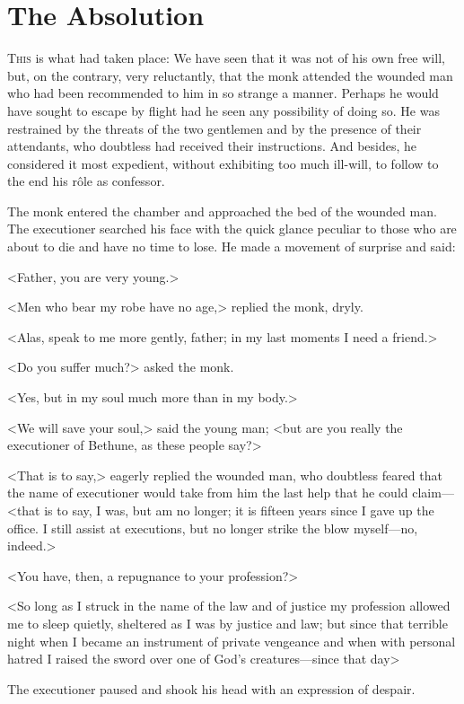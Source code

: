 \chapter{The Absolution}

 \lettrine{T}{his} is what had taken place: We have seen that it was not of his own free will, but, on the contrary, very reluctantly, that the monk attended the wounded man who had been recommended to him in so strange a manner. Perhaps he would have sought to escape by flight had he seen any possibility of doing so. He was restrained by the threats of the two gentlemen and by the presence of their attendants, who doubtless had received their instructions. And besides, he considered it most expedient, without exhibiting too much ill-will, to follow to the end his rôle as confessor.

The monk entered the chamber and approached the bed of the wounded man. The executioner searched his face with the quick glance peculiar to those who are about to die and have no time to lose. He made a movement of surprise and said:

<Father, you are very young.>

<Men who bear my robe have no age,> replied the monk, dryly.

<Alas, speak to me more gently, father; in my last moments I need a friend.>

<Do you suffer much?> asked the monk.

<Yes, but in my soul much more than in my body.>

<We will save your soul,> said the young man; <but are you really the executioner of Bethune, as these people say?>

<That is to say,> eagerly replied the wounded man, who doubtless feared that the name of executioner would take from him the last help that he could claim—<that is to say, I was, but am no longer; it is fifteen years since I gave up the office. I still assist at executions, but no longer strike the blow myself—no, indeed.>

<You have, then, a repugnance to your profession?>

<So long as I struck in the name of the law and of justice my profession allowed me to sleep quietly, sheltered as I was by justice and law; but since that terrible night when I became an instrument of private vengeance and when with personal hatred I raised the sword over one of God's creatures—since that day\longdash>

The executioner paused and shook his head with an expression of despair.

